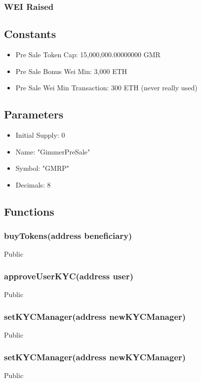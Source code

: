 \documentclass[11pt]{article} %
\begin{document}
\subsubsection{WEI Raised}

\subsection{Constants}
\begin{itemize}
\item Pre Sale Token Cap: 15,000,000.00000000 GMR
\item Pre Sale Bonus Wei Min: 3,000 ETH
\item Pre Sale Wei Min Transaction: 300 ETH (never really used)
\end{itemize}

\subsection{Parameters}
\begin{itemize}
\item Initial Supply: 0
\item Name: "GimmerPreSale"
\item Symbol: "GMRP"
\item Decimals: 8
\end{itemize}

\subsection{Functions}

\subsubsection{buyTokens(address beneficiary)}
Public

\subsubsection{approveUserKYC(address user)}
Public

\subsubsection{setKYCManager(address newKYCManager)}
Public

\subsubsection{setKYCManager(address newKYCManager)}
Public
\end{document}
